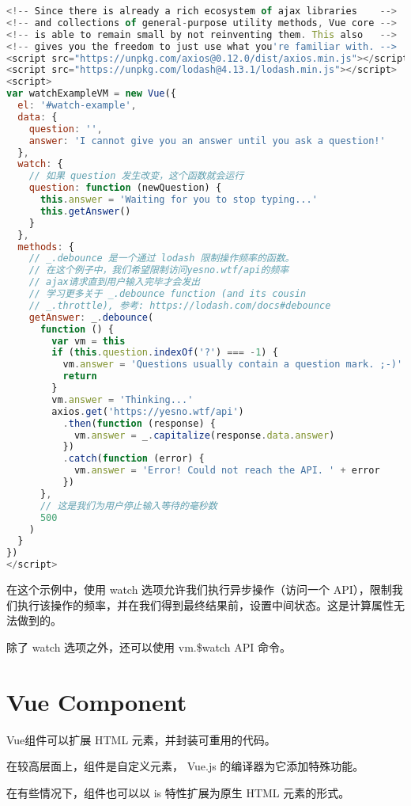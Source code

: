 \begin{lstlisting}[language=JavaScript]
<!-- Since there is already a rich ecosystem of ajax libraries    -->
<!-- and collections of general-purpose utility methods, Vue core -->
<!-- is able to remain small by not reinventing them. This also   -->
<!-- gives you the freedom to just use what you're familiar with. -->
<script src="https://unpkg.com/axios@0.12.0/dist/axios.min.js"></script>
<script src="https://unpkg.com/lodash@4.13.1/lodash.min.js"></script>
<script>
var watchExampleVM = new Vue({
  el: '#watch-example',
  data: {
    question: '',
    answer: 'I cannot give you an answer until you ask a question!'
  },
  watch: {
    // 如果 question 发生改变，这个函数就会运行
    question: function (newQuestion) {
      this.answer = 'Waiting for you to stop typing...'
      this.getAnswer()
    }
  },
  methods: {
    // _.debounce 是一个通过 lodash 限制操作频率的函数。
    // 在这个例子中，我们希望限制访问yesno.wtf/api的频率
    // ajax请求直到用户输入完毕才会发出
    // 学习更多关于 _.debounce function (and its cousin
    // _.throttle), 参考: https://lodash.com/docs#debounce
    getAnswer: _.debounce(
      function () {
        var vm = this
        if (this.question.indexOf('?') === -1) {
          vm.answer = 'Questions usually contain a question mark. ;-)'
          return
        }
        vm.answer = 'Thinking...'
        axios.get('https://yesno.wtf/api')
          .then(function (response) {
            vm.answer = _.capitalize(response.data.answer)
          })
          .catch(function (error) {
            vm.answer = 'Error! Could not reach the API. ' + error
          })
      },
      // 这是我们为用户停止输入等待的毫秒数
      500
    )
  }
})
</script>
\end{lstlisting}

在这个示例中，使用 watch 选项允许我们执行异步操作（访问一个 API），限制我们执行该操作的频率，并在我们得到最终结果前，设置中间状态。这是计算属性无法做到的。

除了 watch 选项之外，还可以使用 vm.\$watch API 命令。





\chapter{Vue Component}



Vue组件可以扩展 HTML 元素，并封装可重用的代码。

\begin{compactitem}
\item 在较高层面上，组件是自定义元素， Vue.js 的编译器为它添加特殊功能。
\item 在有些情况下，组件也可以以 is 特性扩展为原生 HTML 元素的形式。
\end{compactitem}


